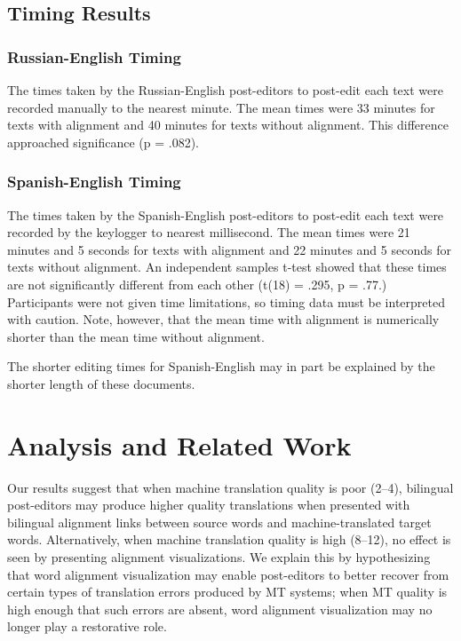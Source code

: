 



\subsection{Timing Results}

\subsubsection{Russian-English Timing}

The times taken by the Russian-English post-editors to post-edit each text were recorded manually to the nearest minute. The mean times were 33 minutes for texts with alignment and 40 minutes for texts without alignment. This difference approached significance (p = .082).

\subsubsection{Spanish-English Timing}

The times taken by the Spanish-English post-editors to post-edit each text were recorded by the keylogger to nearest millisecond. The mean times were 21 minutes  and 5 seconds for texts with alignment and 22 minutes and 5 seconds for texts without alignment. An independent samples t-test showed that these times are not significantly different from each other (t(18) = .295, p = .77.) 
%
Participants were not given time limitations, so timing data must be interpreted with caution. Note, however, that the mean time with alignment is numerically shorter than the mean time without alignment.

The shorter editing times for Spanish-English may in part be explained by the shorter length of these documents.


\section{Analysis and Related Work}
\label{sec:background}

Our results suggest that when machine translation quality is poor (2--4), bilingual post-editors may produce higher quality translations when presented with bilingual alignment links between source words and machine-translated target words.
%
Alternatively, when machine translation quality is high (8--12), no effect is seen by presenting alignment visualizations.
%
We explain this by hypothesizing that word alignment visualization may enable post-editors to better recover from certain types of translation errors produced by MT systems; when MT quality is high enough that such errors are absent, word alignment visualization may no longer play a restorative role.


